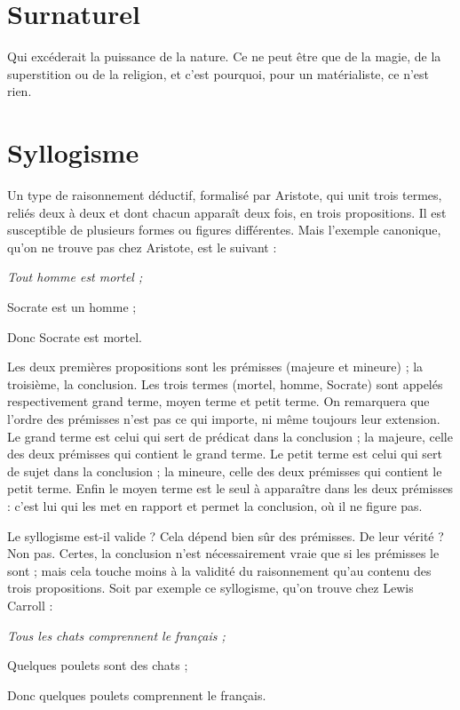 \section{Surnaturel}
Qui excéderait la puissance de la nature. Ce ne peut être
que de la magie, de la superstition ou de la religion, et c’est
pourquoi, pour un matérialiste, ce n’est rien.

\section{Syllogisme}
Un type de raisonnement déductif, formalisé par Aristote,
qui unit trois termes, reliés deux à deux et dont chacun apparaît
deux fois, en trois propositions. Il est susceptible de plusieurs formes ou
figures différentes. Mais l'exemple canonique, qu’on ne trouve pas chez Aristote,
est le suivant :
\begin{center}
{\it Tout homme est mortel ;

Socrate est un homme ;

Donc Socrate est mortel.}
\end{center}
Les deux premières propositions sont les prémisses (majeure et mineure) ;
la troisième, la conclusion. Les trois termes (mortel, homme, Socrate) sont
appelés respectivement grand terme, moyen terme et petit terme. On remarquera
que l’ordre des prémisses n’est pas ce qui importe, ni même toujours leur
extension. Le grand terme est celui qui sert de prédicat dans la conclusion ; la
majeure, celle des deux prémisses qui contient le grand terme. Le petit terme
est celui qui sert de sujet dans la conclusion ; la mineure, celle des deux prémisses
qui contient le petit terme. Enfin le moyen terme est le seul à apparaître
dans les deux prémisses : c’est lui qui les met en rapport et permet la conclusion,
où il ne figure pas.

Le syllogisme est-il valide ? Cela dépend bien sûr des prémisses. De leur
vérité ? Non pas. Certes, la conclusion n’est nécessairement vraie que si les prémisses
le sont ; mais cela touche moins à la validité du raisonnement qu’au
contenu des trois propositions. Soit par exemple ce syllogisme, qu’on trouve
chez Lewis Carroll :

\begin{center}
{\it 
Tous les chats comprennent le français ;

Quelques poulets sont des chats ;

Donc quelques poulets comprennent le français.}
\end{center}

